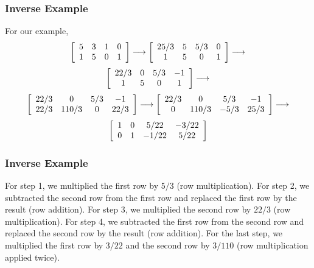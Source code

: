 \documentclass[xcolor=dvipsnames]{beamer}
\begin{document}
\begin{frame}
  \frametitle{Inverse Example}
For our example,
  \begin{equation}
    \label{eq:weeraesh}
  \left[\begin{array}{cccc}
 5    & 3     & 1     & 0     \\
 1    & 5     & 0     & 1
  \end{array}\right]\longrightarrow
  \left[\begin{array}{cccc}
 25/3 & 5     & 5/3   & 0     \\
 1    & 5     & 0     & 1
        \end{array}\right]\longrightarrow\notag
\end{equation}
  \begin{equation}
  \left[\begin{array}{cccc}
 22/3 & 0     & 5/3   & -1    \\
 1    & 5     & 0     & 1
  \end{array}\right]\longrightarrow\notag
\end{equation}
  \begin{equation}
    \label{eq:ieyoongu}
  \left[\begin{array}{cccc}
 22/3 & 0     & 5/3   & -1    \\
 22/3 & 110/3 & 0     & 22/3
  \end{array}\right]\longrightarrow
  \left[\begin{array}{cccc}
 22/3 & 0     & 5/3   & -1    \\
 0    & 110/3 & -5/3  & 25/3
  \end{array}\right]\longrightarrow\notag
\end{equation}
  \begin{equation}
    \label{eq:ephoopha}
  \left[\begin{array}{cccc}
 1    & 0     & 5/22  & -3/22 \\
 0    & 1     & -1/22 & 5/22
  \end{array}\right]\notag
  \end{equation}
\end{frame}

\begin{frame}
  \frametitle{Inverse Example}
  For step 1, we multiplied the first row by $5/3$ (row
  multiplication). For step 2, we subtracted the second row from the
  first row and replaced the first row by the result (row addition).
  For step 3, we multiplied the second row by $22/3$ (row
  multiplication). For step 4, we subtracted the first row from the
  second row and replaced the second row by the result (row addition).
  For the last step, we multiplied the first row by $3/22$ and the
  second row by $3/110$ (row multiplication applied twice).
\end{frame}
\end{document}
